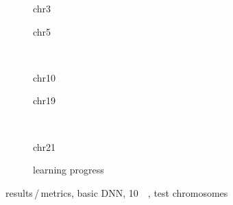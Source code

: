 \begin{figure}[p]
    \begin{subfigure}{0.45\textwidth}
        \scriptsize
        \caption{chr3}
    \end{subfigure} \hfill
    \begin{subfigure}{0.45\textwidth}
        \scriptsize
        \caption{chr5}
    \end{subfigure}\\[5mm]
    \begin{subfigure}{0.45\textwidth}
        \scriptsize
        \caption{chr10}
    \end{subfigure}\hfill
    \begin{subfigure}{0.45\textwidth}
        \scriptsize
        \caption{chr19}
    \end{subfigure}\\[3mm]
    \centering
    \begin{subfigure}{0.45\textwidth}
        \scriptsize
        \caption{chr21}
    \end{subfigure}\hfill
     \begin{subfigure}{0.45\textwidth}
        \caption{learning progress}\label{fig:results:basicDNN_lossEpochs_10}
    \end{subfigure}
    \caption{results\,/\,metrics, basic DNN, \SI{10}{\kilo\bp}, test chromosomes}
    \label{fig:results:basicDNN_10k_pearson}
\end{figure}

